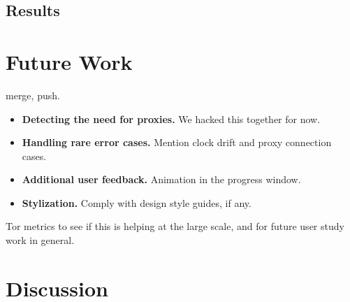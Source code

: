 \documentclass{template}
\begin{document}
\subsection{Results} 

\section{Future Work} 
{\color {red}
 merge, push. 

\begin{itemize} \itemsep1pt \parskip0pt  
\item {\bfseries Detecting the need for proxies.} We hacked this together for now. 
\item {\bfseries Handling rare error cases.} Mention clock drift and proxy connection cases.
\item {\bfseries Additional user feedback.} Animation in the progress window. 
\item {\bfseries Stylization.} Comply with design style guides, if any. 
\end{itemize} 

 Tor metrics to see if this is helping at the large scale, and for future user study work in general. 
}

\section{Discussion} 
\end{document}

